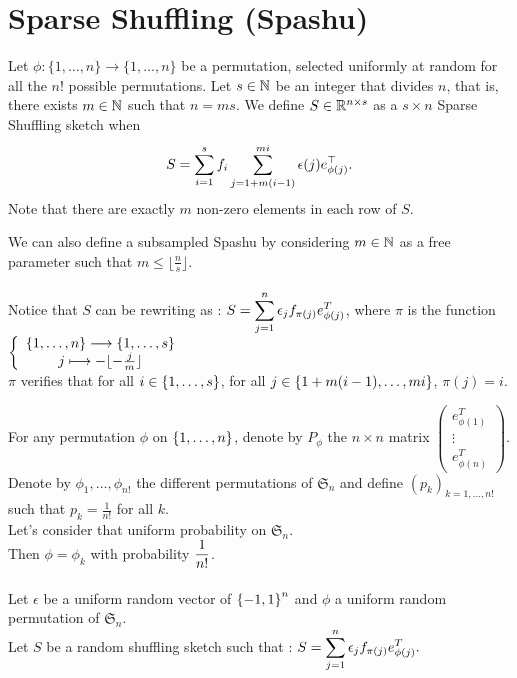 \section{Sparse Shuffling (Spashu)}

Let $\phi: \{1,\ldots, n\} \rightarrow \{1,\ldots, n\}$ be a permutation, selected uniformly at random for all the $n!$ possible permutations. Let $s\in {\mathbb N}$ be an integer that divides $n$, that is, there exists $m \in {\mathbb N}$ such that $n = ms.$ We define $S \in {\mathbb R}^{n \times s}$ as a $s\times n$ Sparse Shuffling sketch when
 \[S = \displaystyle\sum_{i=1}^s f_i \sum_{j=1+m(i-1)}^{mi} \epsilon(j)e_{\phi(j)}^\top.\]
 Note that there are exactly $m$ non-zero elements in each row of $S$.
 
 We can also define a subsampled Spashu by considering $m \in {\mathbb N}$ as a free parameter such that $m \leq \lfloor \frac{n}{s} \rfloor.$\\\\
 
 
Notice that $S$ can be rewriting as : $S = \displaystyle\sum_{j=1}^{n} \epsilon_{j}f_{\pi(j)}e_{\phi(j)}^{T} $, where $\pi$ is the function $\left\{\begin{array}{c}\left\{1,\dots,n\right\}\longrightarrow \left\{1,\dots,s\right\}\\ j \longmapsto -\lfloor -\frac{j}{m} \rfloor\end{array}\right.$\\
 
 $\pi$ verifies that for all $i \in \left\{1,\dots,s\right\}$, for all $j \in \left\{1+m (i-1),\dots,m i\right\}$, $\pi(j) = i. $
 
 For any permutation $\phi$ on $\left\{1,\dots,n\right\}$, denote by $P_{\phi}$ the $n\times n$ matrix $ \begin{pmatrix} e_{\phi(1)}^{T} \\ \vdots \\ e_{\phi(n)}^{T} \end{pmatrix} $.\\
 Denote by $\phi_{1},\dots,\phi_{n!}$ the different permutations of $\mathfrak{S}_{n}$ and define $(p_{k})_{k=1,\dots,n!}$ such that $p_{k} = \frac{1}{n!}$ for all $k$.\\ Let's consider that uniform probability on $\mathfrak{S}_{n}$.\\ Then $\phi = \phi_{k}$ with probability $\displaystyle \frac{1}{n!}$.\\\\
 
 Let $\epsilon$ be a uniform random vector of $\left\{-1,1\right\}^{n}$ and $\phi$ a uniform random permutation of $\mathfrak{S}_{n}$.\\
Let $S$ be a random shuffling sketch such that : $S = \displaystyle\sum_{j=1}^{n} \epsilon_{j}f_{\pi(j)}e_{\phi(j)}^{T} .$\\

